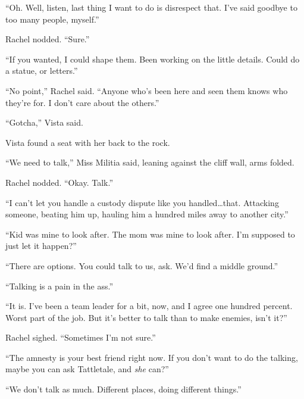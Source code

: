 ``Oh.  Well, listen, last thing I want to do is disrespect that.  I've said goodbye to too many people, myself.''



Rachel nodded.  ``Sure.''



``If you wanted, I could shape them.  Been working on the little details.  Could do a statue, or letters.''



``No point,'' Rachel said.  ``Anyone who's been here and seen them knows who they're for.  I don't care about the others.''



``Gotcha,'' Vista said.



Vista found a seat with her back to the rock.



``We need to talk,'' Miss Militia said, leaning against the cliff wall, arms folded.



Rachel nodded.  ``Okay.  Talk.''



``I can't let you handle a custody dispute like you handled\ldots that.  Attacking someone, beating him up, hauling him a hundred miles away to another city.''



``Kid was mine to look after.  The mom was mine to look after.  I'm supposed to just let it happen?''



``There are options.  You could talk to us, ask.  We'd find a middle ground.''



``Talking is a pain in the ass.''



``It is.  I've been a team leader for a bit, now, and I agree one hundred percent.  Worst part of the job.  But it's better to talk than to make enemies, isn't it?''



Rachel sighed.  ``Sometimes I'm not sure.''



``The amnesty is your best friend right now.  If you don't want to do the talking, maybe you can ask Tattletale, and \emph{she} can?''



``We don't talk as much.  Different places, doing different things.''



